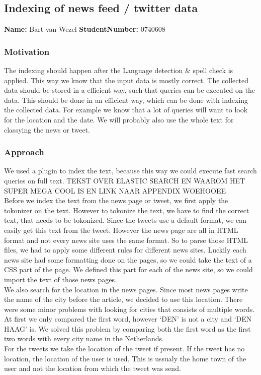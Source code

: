 \subsection{Indexing of news feed / twitter data   }
\textbf{Name:} Bart van Wezel  \textbf{StudentNumber:} 0740608

\subsubsection*{Motivation}
The indexing should happen after the Language detection \& spell check is applied. This way we know that the input data is mostly correct.  The collected data should be stored in a efficient way, such that queries can be executed on the data. This should be done in an efficient way, which can be done with indexing the collected data. 
For example we know that a lot of queries will want to look for the location and the date. 
We will probably also use the whole text for classying the news or tweet. 

\subsubsection*{Approach}
We used a plugin to index the text, because this way we could execute fast search queries on full text. 
TEKST OVER ELASTIC SEARCH EN WAAROM HET SUPER MEGA COOL IS EN LINK NAAR APPENDIX WOEHOOEE \\
Before we index the text from the news page or tweet, we first apply the tokonizer on the text.
However to tokonize the text, we have to find the correct text, that needs to be tokonized.
Since the tweets use a default format, we can easily get this text from the tweet. 
However the news page are all in HTML format and not every news site uses the same format. 
So to parse those HTML files, we had to apply some different rules for different news sites.
Luckily each news site had some formatting done on the pages, so we could take the text of a CSS part of the page. 
We defined this part for each of the news site, so we could import the text of those news pages.  \\
We also search for the location in the news pages. 
Since most news pages write the name of the city before the article, we decided to use this location.
There were some minor problems with looking for cities that consists of multiple words. 
At first we only compared the first word, however `DEN' is not a city and `DEN HAAG' is. 
We solved this problem by comparing both the first word as the first two words with every city name in the Netherlands. \\
 For the tweets we take the location of the tweet if present. 
If the tweet has no location, the location of the user is used. 
This is ussualy the home town of the user and not the location from which the tweet was send.\\ 

